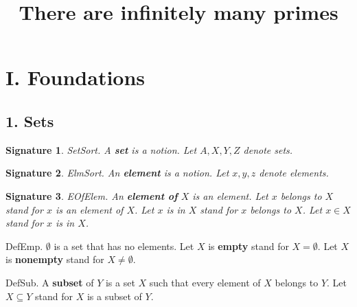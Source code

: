 \newtheorem{signature}{Signature} 
\newtheorem{axiom}{Axiom} 
\newcommand{\power}{{\cal P}} 
\newcommand{\preimg}[2]{{#1}^{-1}[#2]} 
\newcommand{\Seq}[2]{\{#1,\dots,#2\}}
\newcommand{\Set}[3]{\{#1_{#2},\dots,#1_{#3}\}}
\newcommand{\Product}[3]{\prod_{i=#2}^{#3}{#1}_i}
\newcommand{\subfunc}[2]{{#1}_{#2}}
\newcommand{\CC}{{\Bbb C}}
\newcommand{\RR}{{\Bbb R}}
\newcommand{\QQ}{{\Bbb Q}}
\newcommand{\ZZ}{{\Bbb Z}} 
\newcommand{\NN}{{\Bbb N}}


\title{There are infinitely many primes}
\maketitle
\section{I. Foundations}


\subsection{1. Sets}


\begin{signature} SetSort.  A {\bf set} is a notion.
Let $A,X,Y,Z$ denote sets.
\end{signature}

\begin{signature} ElmSort.  
An {\bf element} is a notion.
Let $x,y,z$ denote elements.
\end{signature}

\begin{signature} EOfElem.  
An {\bf element of} $X$ is an element.
Let $x$ belongs to $X$ stand for $x$ is an element of $X$.
Let $x$ is in $X$ stand for $x$ belongs to $X$.
Let $x \in X$ stand for $x$ is in $X$.
\end{signature}

\begin{definition} DefEmp.
$\emptyset$ is a set that has no elements.
Let $X$ is {\bf empty} stand for $X = \emptyset$.
Let $X$ is {\bf nonempty} stand for $X \neq \emptyset$.
\end{definition}

\begin{definition} DefSub.  
A {\bf subset} of $Y$ is a set $X$ such that
every element of $X$ belongs to $Y$.
Let $X \subseteq Y$ stand for $X$ is a subset of $Y$.
\end{definition}

